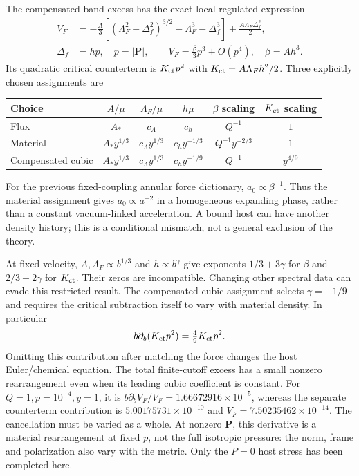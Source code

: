 \documentclass[11pt]{article}
\begin{document}
The compensated band excess has the exact local regulated expression
\begin{align}
 V_F&=-\frac A3[(\Lambda_F^2+\Delta_f^2)^{3/2}
             -\Lambda_F^3-\Delta_f^3]
             +\frac{A\Lambda_F\Delta_f^2}{2},\\
 \Delta_f&=hp,\quad p=|\boldsymbol P|,\qquad
 V_F=\frac\beta3p^3+O(p^4),\quad \beta=Ah^3.
 \label{mf:det}
\end{align}
Its quadratic critical counterterm is $K_{\rm ct}p^2$ with
$K_{\rm ct}=A\Lambda_Fh^2/2$. Three explicitly chosen assignments are
\begin{center}
\begin{tabular}{lccccc}
\toprule
Choice & $A/\mu$ & $\Lambda_F/\mu$ & $h\mu$ & $\beta$ scaling
 & $K_{\rm ct}$ scaling\\
\midrule
Flux & $A_*$ & $c_\Lambda$ & $c_h$ & $Q^{-1}$ & $1$\\
Material & $A_*y^{1/3}$ & $c_\Lambda y^{1/3}$ & $c_hy^{-1/3}$
 & $Q^{-1}y^{-2/3}$ & $1$\\
Compensated cubic & $A_*y^{1/3}$ & $c_\Lambda y^{1/3}$ & $c_hy^{-1/9}$
 & $Q^{-1}$ & $y^{4/9}$\\
\bottomrule
\end{tabular}
\end{center}
For the previous fixed-coupling annular force dictionary, $a_0\propto
\beta^{-1}$. Thus the material assignment gives $a_0\propto a^{-2}$
in a homogeneous expanding phase, rather than a constant vacuum-linked
acceleration. A bound host can have another density history; this is a
conditional mismatch, not a general exclusion of the theory.

At fixed velocity, $A,\Lambda_F\propto b^{1/3}$ and $h\propto b^\gamma$
give exponents $1/3+3\gamma$ for $\beta$ and $2/3+2\gamma$ for
$K_{\rm ct}$. Their zeros are incompatible. Changing other spectral data
can evade this restricted result. The compensated cubic assignment selects
$\gamma=-1/9$ and requires the critical subtraction itself to vary with
material density. In particular
\begin{equation}
 b\partial_b(K_{\rm ct}p^2)=\tfrac49 K_{\rm ct}p^2.
\end{equation}
Omitting this contribution after matching the force changes the host
Euler/chemical equation. The total finite-cutoff excess has a small
nonzero rearrangement even when its leading cubic coefficient is constant.
For $Q=1,p=10^{-4},y=1$, it is
$b\partial_bV_F/V_F=1.66672916\times10^{-5}$, whereas the separate
counterterm contribution is $5.00175731\times10^{-10}$ and
$V_F=7.50235462\times10^{-14}$. The cancellation must be varied as a
whole. At nonzero $\boldsymbol P$, this derivative is a material
rearrangement at fixed $p$, not the full isotropic pressure: the norm,
frame and polarization also vary with the metric. Only the $P=0$ host
stress has been completed here.
\end{document}
